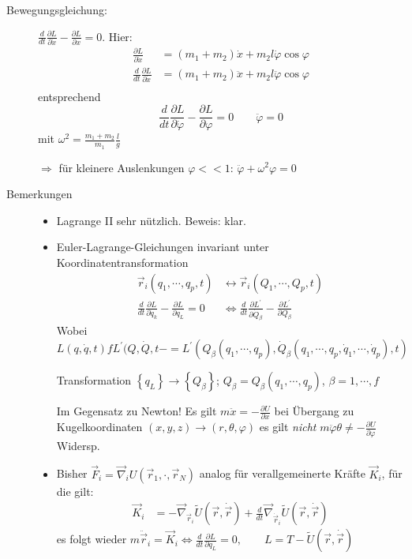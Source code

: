\begin{enumerate}
\begin{description}
\item[Bewegungsgleichung:]
  $\frac{d}{dt}\frac{\partial L}{\partial \dot{x}} - \frac{\partial
    L}{\partial x} = 0$. 
  Hier:
\begin{align*}
  \frac{\partial L}{\partial \dot{x}}
  &= (m_1+m_2)\dot{x}+m_2l\dot{\varphi}\cos\varphi\\
  \frac{d}{dt}\frac{\partial L}{\partial \dot{x}}
  &= (m_1+m_2)\ddot{x} + m_2l\ddot{\varphi}\cos\varphi\\
\end{align*}
entsprechend
\begin{equation*}
\frac{d}{dt}\frac{\partial L}{\partial \dot{\varphi}}-\frac{\partial L}{\partial \varphi} = 0
\qquad \ddot{\varphi} = 0
\end{equation*}
mit $\omega^2=\frac{m_1+m_2}{m_1}\frac{l}{g}$

$\Rightarrow$ für kleinere Auslenkungen $\varphi<<1$: $\ddot{\varphi}+\omega^2\varphi=0$

\item[Bemerkungen]
\begin{itemize}
\item Lagrange II sehr nützlich. Beweis: klar.
\item Euler-Lagrange-Gleichungen invariant unter
  Koordinatentransformation
  \begin{align*}
    \vec{r}_i(q_1,\cdots,q_p,t)
    &\leftrightarrow \vec{r}_i(Q_1,\cdots,Q_p,t)\\
    \frac{d}{dt}\frac{\partial L}{\partial \dot{q}_k}-\frac{\partial L}{\partial q_L} = 0
    &\Leftrightarrow \frac{d}{dt} \frac{\partial L^{\prime}}{\partial \dot{Q}_{\beta}}
      - \frac{\partial L^{\prime}}{\partial Q_{\beta}}
  \end{align*}
  Wobei
  $L(q,\dot{q},t) f L^{\prime}(Q,\dot{Q},t- =
  L^{\prime}(Q_{\beta}(q_1,\cdots,q_p),\dot{Q}_{\beta}(q_1,\cdots,q_p,
  \dot{q}_1,\cdots,\dot{q}_p),t)$

  Transformation
  $\left\{ q_L \right\} \rightarrow \left\{ Q_{\beta} \right\}$;
  $Q_{\beta}=Q_{\beta}(q_1,\cdots,q_p)$, $\beta = 1,\cdots,f$

  Im Gegensatz zu Newton!  Es gilt
  $m\ddot{x} = - \frac{\partial U}{\partial x}$ bei Übergang zu
  Kugelkoordinaten $(x,y,z)\rightarrow(r,\theta,\varphi)$ es gilt
  \emph{nicht}
  $m\ddot{\varphi} \theta \not= - \frac{\partial U}{\partial \varphi}$ Widersp.
\item Bisher $\vec{F}_i = \vec{\nabla}_iU(\vec{r}_1,\cdot,\vec{r}_N)$
  analog für verallgemeinerte Kräfte $\vec{K}_i$, für die gilt:
  \begin{align*}
    \vec{K}_i &= -\vec{\nabla}_{\vec{r}_i}\tilde{U}(\vec{r},\dot\vec{r})
                + \frac{d}{dt}\vec{\nabla}_{\dot\vec{r}_i} \tilde{U}(\vec{r},\dot\vec{r})
  \end{align*}
  es folgt wieder
  $m\ddot\vec{r}_i = \vec{K}_{i} \Leftrightarrow
  \frac{d}{dt}\frac{\partial L}{\partial q_L} = 0, \qquad L = T -
  \tilde{U}(\vec{r},\dot\vec{r})$


\end{itemize}
\end{description}
\end{enumerate}
